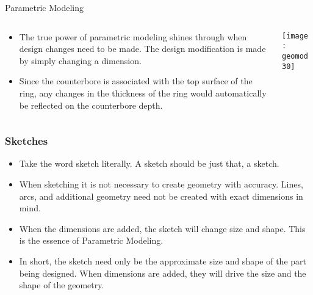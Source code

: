 \begin{frame}[fragile]{Parametric Modeling}
 \begin{columns}
  \begin{column}{0.55\linewidth}

\begin{itemize}
\item The true power of parametric modeling shines through when design changes need to be made. The design modification is made by simply changing a dimension. 
\item Since the counterbore is associated with the top surface of the ring, any changes in the thickness of the ring would automatically be reflected on the counterbore depth.

\end{itemize}
	
  \end{column}%
  \begin{column}{0.45\linewidth}
			\begin{center}
	\texttt{[image: geomod30]}
			\end{center}
  \end{column}
 \end{columns}
\end{frame}

\begin{frame}[fragile]\frametitle{Sketches}

\begin{itemize}
\item Take the word sketch literally. A sketch should be just that, a sketch.
\item When sketching it is not necessary to create geometry with accuracy. Lines, arcs, and additional geometry need not be created with exact dimensions in mind. 
\item When the dimensions are added, the sketch will change size and shape. This is the essence of Parametric Modeling.
\item In short, the sketch need only be the approximate size and shape of the part being designed. When dimensions are added, they will drive the size and the shape of the geometry.

\end{itemize}
\end{frame}

